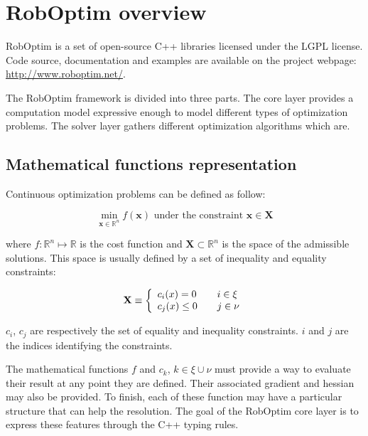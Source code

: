 \documentclass[conference,final,a4paper,twocolumn,9pt]{IEEEtran}
\begin{document}
\section{RobOptim overview}\label{sec:roboptim}


RobOptim is a set of open-source C++ libraries licensed under the LGPL
license. Code source, documentation and examples are available on the
project webpage: \mbox{\url{http://www.roboptim.net/}}.


The RobOptim framework is divided into three parts. The core layer
provides a computation model expressive enough to model different
types of optimization problems. The solver layer gathers different
optimization algorithms which are.


\subsection{Mathematical functions representation}


Continuous optimization problems can be defined as follow:

\begin{equation}\label{eq:optimization}
  \min_{\mathbf{x} \in \mathbb{R}^n} f(\mathbf{x}) \text{ under the constraint } \mathbf{x} \in \mathbf{X}
\end{equation}

where $f : \mathbb{R}^n \mapsto \mathbb{R}$ is the cost function and
$\mathbf{X} \subset \mathbb{R}^n$ is the space of the admissible
solutions. This space is usually defined by a set of inequality and
equality constraints:

\begin{equation}
  \mathbf{X} \equiv \left\{
  \begin{array}{l l}
    c_i (x) = 0    & \quad i \in \xi \\
    c_j (x) \leq 0 & \quad j \in \nu \\
  \end{array} \right.
\end{equation}

$c_i$, $c_j$ are respectively the set of equality and inequality
constraints. $i$ and $j$ are the indices identifying the constraints.

The mathematical functions $f$ and $c_k$, $k \in \xi \cup \nu$ must
provide a way to evaluate their result at any point they are
defined. Their associated gradient and hessian may also be
provided. To finish, each of these function may have a particular
structure that can help the resolution. The goal of the RobOptim core
layer is to express these features through the C++ typing rules.
\end{document}
